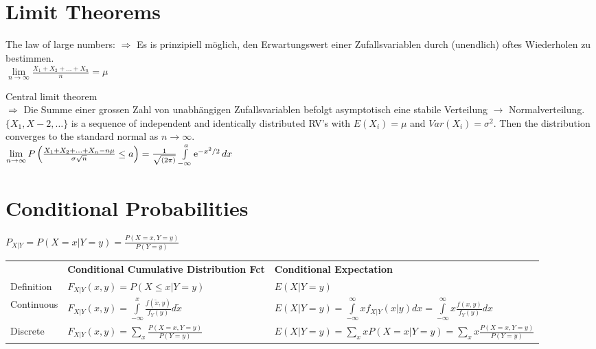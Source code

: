 
\section{Limit Theorems }
\begin{liste}
\item The law of large numbers:
	$\Rightarrow$ Es is prinzipiell möglich, den Erwartungswert einer Zufallsvariablen durch (unendlich) oftes Wiederholen zu bestimmen.\\
	$\lim\limits_{n \rightarrow \infty}{\frac{X_1+X_2+\ldots+X_n}{n}}=\mu$
\item Central limit theorem\\
	$\Rightarrow$ Die Summe einer grossen Zahl von unabhängigen Zufallsvariablen befolgt asymptotisch eine stabile Verteilung $\to$ Normalverteilung.\\
	$\{X_1,X-2,\ldots\}$ is a sequence of independent and identically distributed RV's with $E(X_i)=\mu$ and $Var(X_i)=\sigma^2$. Then the distribution converges to the standard normal as $n\rightarrow\infty$.\\

$\lim\limits_{n \rightarrow \infty}{P\left(\frac{X_1+X_2+\ldots+X_n-n\mu}{\sigma \sqrt{n}}\leq a\right)}=\frac{1}{\sqrt{(2\pi)}}\int\limits_{-\infty}^{a}{\operatorname{\mathrm e}^{-x^2/2}dx}$
\end{liste}

\newpage

\section{Conditional Probabilities }
$\boxed{P_{X|Y}=P(X=x|Y=y)=\frac{P(X=x,Y=y)}{P(Y=y)}}$\\

\begin{tabular}{lll}

  & \textbf{Conditional Cumulative Distribution Fct} & \textbf{Conditional Expectation}\\[0.3cm]
  
Definition & $\boxed{F_{X|Y}(x,y)=P(X \leq x|Y=y)}$ & $E(X|Y=y)$\\[0.3cm]
Continuous & $F_{X|Y}(x,y)=\int\limits_{-\infty}^{x}\frac{f(\tilde{x},y)}{f_Y(y)}d\tilde{x}$	& $E(X|Y=y) = \int\limits_{-\infty}^{\infty}xf_{X|Y}(x|y)dx = \int\limits_{-\infty}^{\infty}x\frac{f(x,y)}{f_Y(y)}dx$\\[0.5cm]
Discrete   & $F_{X|Y}(x,y)=\sum\limits_{x} \frac{P(X=x, Y=y)}{P(Y=y)}$ &	$E(X|Y=y) = \sum\limits_{x} x P(X=x|Y=y) = \sum\limits_{x} x \frac{P(X=x, Y=y)}{P(Y=y)}$\\
\end{tabular}\\

